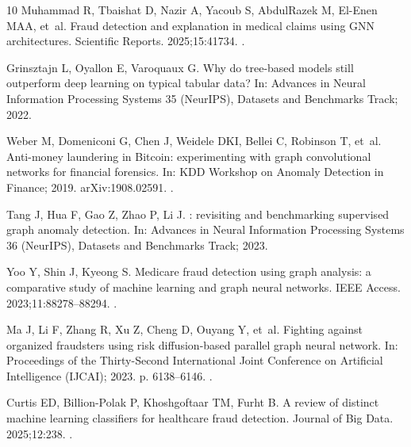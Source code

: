 \documentclass[pdflatex,sn-vancouver-num]{sn-jnl}
\begin{document}
\begin{thebibliography}{10}
Muhammad R, Tbaishat D, Nazir A, Yacoub S, AbdulRazek M, El-Enen MAA, et~al.
\newblock Fraud detection and explanation in medical claims using {GNN}
  architectures.
\newblock Scientific Reports. 2025;15:41734.
\newblock {}.

Grinsztajn L, Oyallon E, Varoquaux G.
\newblock Why do tree-based models still outperform deep learning on typical
  tabular data?
\newblock In: Advances in Neural Information Processing Systems 35 (NeurIPS),
  Datasets and Benchmarks Track; 2022.

Weber M, Domeniconi G, Chen J, Weidele DKI, Bellei C, Robinson T, et~al.
\newblock Anti-money laundering in {Bitcoin}: experimenting with graph
  convolutional networks for financial forensics.
\newblock In: KDD Workshop on Anomaly Detection in Finance; 2019.
  {arXiv}:1908.02591.
\newblock {}.

Tang J, Hua F, Gao Z, Zhao P, Li J.
: revisiting and benchmarking supervised graph anomaly
  detection.
\newblock In: Advances in Neural Information Processing Systems 36 (NeurIPS),
  Datasets and Benchmarks Track; 2023.

Yoo Y, Shin J, Kyeong S.
\newblock Medicare fraud detection using graph analysis: a comparative study of
  machine learning and graph neural networks.
\newblock IEEE Access. 2023;11:88278--88294.
\newblock {}.

Ma J, Li F, Zhang R, Xu Z, Cheng D, Ouyang Y, et~al.
\newblock Fighting against organized fraudsters using risk diffusion-based
  parallel graph neural network.
\newblock In: Proceedings of the Thirty-Second International Joint Conference
  on Artificial Intelligence (IJCAI); 2023. p. 6138--6146.
\newblock {}.

Curtis ED, Billion-Polak P, Khoshgoftaar TM, Furht B.
\newblock A review of distinct machine learning classifiers for healthcare
  fraud detection.
\newblock Journal of Big Data. 2025;12:238.
\newblock {}.


\end{thebibliography}
\end{document}
